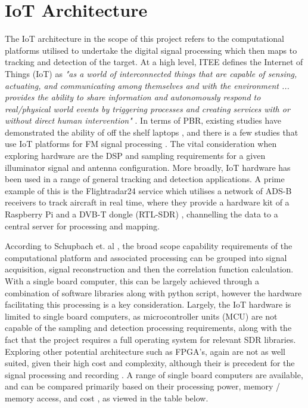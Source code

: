 \section{IoT Architecture}

The IoT architecture in the scope of this project refers to the computational platforms utilised to undertake the digital signal processing which then maps to tracking and detection of the target. At a high level, ITEE defines the Internet of Things (IoT) as \textit{"as a world of interconnected things that are capable of sensing, actuating, and communicating among themselves and with the environment ... provides the ability to share information and autonomously respond to real/physical world events by triggering processes and creating services with or without direct human intervention"} \cite{IoTdefinition}. In terms of PBR, existing studies have demonstrated the ability of off the shelf laptops \cite{FMlowCost}, and there is a few studies that use IoT platforms for FM signal processing \cite{IOTpassiveRadar}. The vital consideration when exploring hardware are the DSP and sampling requirements for a given illuminator signal and antenna configuration. More broadly, IoT hardware has been used in a range of general tracking and detection applications. A prime example of this is the Flightradar24 service which utilises a network of ADS-B receivers to track aircraft in real time, where they provide a hardware kit of a Raspberry Pi and a DVB-T dongle (RTL-SDR) \cite{flightradar24}, channelling the data to a central server for processing and mapping. 

\par \vspace{0.5cm} 
\noindent According to Schupbach et. al \cite{DABprocessingChain}, the broad scope capability requirements of the computational platform and associated processing can be grouped into signal acquisition, signal reconstruction and then the correlation function calculation. With a single board computer, this can be largely achieved through a combination of software libraries along with python script, however the hardware facilitating this processing is a key consideration. Largely, the IoT hardware is limited to single board computers, as microcontroller units (MCU) are not capable of the sampling and detection processing requirements, along with the fact that the project requires a full operating system for relevant SDR libraries. Exploring other potential architecture such as FPGA's, again are not as well suited, given their high cost and complexity, although their is precedent for the signal processing and recording \cite{FPGAhardware}. A range of single board computers are available, and can be compared primarily based on their processing power, memory / memory access, and cost \cite{sbc_hardware}, as viewed in the table below.

